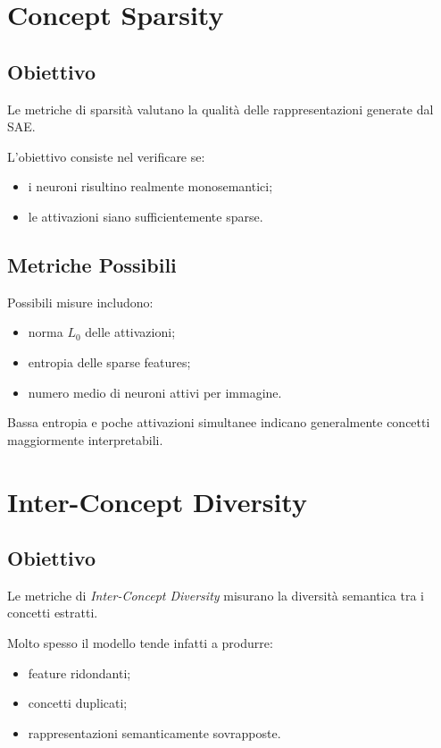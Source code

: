 \section{Concept Sparsity}

\subsection{Obiettivo}

Le metriche di sparsità valutano la qualità delle rappresentazioni generate dal SAE.

L'obiettivo consiste nel verificare se:

\begin{itemize}
    \item i neuroni risultino realmente monosemantici;
    \item le attivazioni siano sufficientemente sparse.
\end{itemize}

\subsection{Metriche Possibili}

Possibili misure includono:

\begin{itemize}
    \item norma $L_0$ delle attivazioni;
    \item entropia delle sparse features;
    \item numero medio di neuroni attivi per immagine.
\end{itemize}

Bassa entropia e poche attivazioni simultanee indicano generalmente concetti maggiormente interpretabili.

\section{Inter-Concept Diversity}

\subsection{Obiettivo}

Le metriche di \textit{Inter-Concept Diversity} misurano la diversità semantica tra i concetti estratti.

Molto spesso il modello tende infatti a produrre:

\begin{itemize}
    \item feature ridondanti;
    \item concetti duplicati;
    \item rappresentazioni semanticamente sovrapposte.
\end{itemize}

